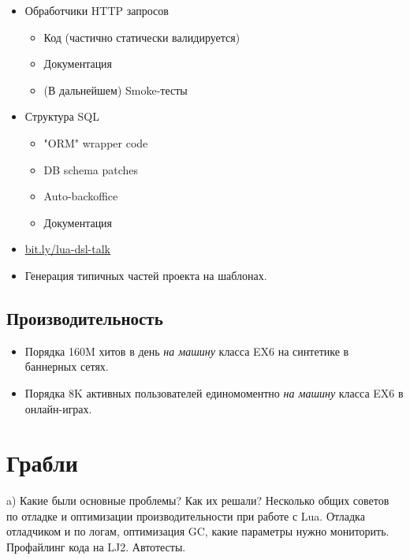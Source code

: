 \documentclass[aspectratio=169,handout,bigger]{beamer}
\begin{document}
\begin{frame}
  \begin{itemize}
    \item Обработчики HTTP запросов
    \begin{itemize}
      \item Код (частично статически валидируется)
      \item Документация
      \item (В дальнейшем) Smoke-тесты
    \end{itemize}
    \item Структура SQL
    \begin{itemize}
      \item "ORM" wrapper code
      \item DB schema patches
      \item Auto-backoffice
      \item Документация
    \end{itemize}
    \item \url{bit.ly/lua-dsl-talk}
    \item Генерация типичных частей проекта на шаблонах.
  \end{itemize}
\end{frame}


\subsection*{Производительность}
\begin{frame}
  \begin{itemize}
    \item Порядка 160M хитов в день \emph{на машину} класса EX6 на синтетике в баннерных сетях.
    \item Порядка 8K активных пользователей единомоментно \emph{на машину} класса EX6 в онлайн-играх.
  \end{itemize}
\end{frame}


\section{Грабли}

\begin{frame}
a) Какие были основные проблемы? Как их решали? Несколько общих советов по отладке и оптимизации производительности при работе с Lua. Отладка отладчиком и по логам, оптимизация GC, какие параметры нужно мониторить. Профайлинг кода на LJ2. Автотесты.
\end{frame}
\end{document}
